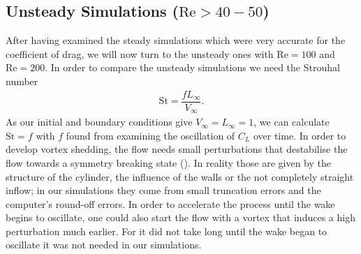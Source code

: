 	\subsection{Unsteady Simulations ($\text{Re}> 40-50$)}
	After having examined the steady simulations which were very accurate for the coefficient of drag, we will now turn to the unsteady ones with $\text{Re}=100$ and $\text{Re}=200$.
	In order to compare the unsteady simulations we need the Strouhal number
	\begin{align}
		\text{St} = \dfrac{f  L_\infty}{V_\infty}.
	\end{align}
	As our initial and boundary conditions give $V_\infty = L_\infty = 1$, we can calculate $\text{St} = f$ with $f$ found from examining the oscillation of $C_L$ over time. In order to develop vortex shedding, the flow needs small perturbations that destabilise the flow towards a symmetry breaking state (\textcite{FLM:14223}). In reality those are given by the structure of the cylinder, the influence of the walls or the not completely straight inflow; in our simulations they come from small truncation errors and the computer's round-off errors. 
	In order to accelerate the process until the wake begins to oscillate, one could also start the flow with a vortex that induces a high perturbation much earlier. For it did not take long until the wake began to oscillate it was not needed in our simulations.
